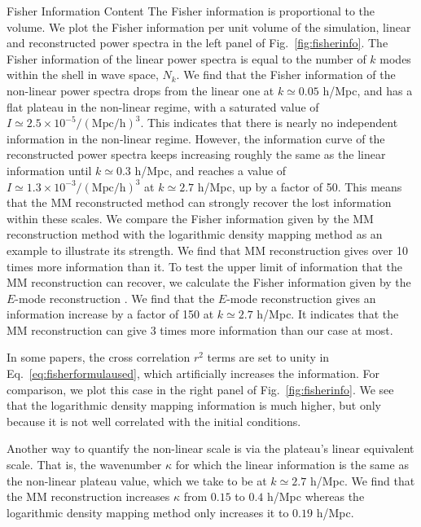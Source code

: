 \begin{section}{Fisher Information Content}
  The Fisher information is proportional to the volume. 
  We plot the Fisher information per unit volume of the
  simulation, linear and reconstructed power spectra in the left panel of 
  Fig.~\ref{fig:fisherinfo}. The Fisher information of the linear 
  power spectra is equal to the number of $k$ modes within the shell in 
  wave space, $N_k$. We find that the Fisher information of the
  non-linear power spectra drops from the linear one at
  $k \simeq 0.05$ h/Mpc, and has a flat plateau in the non-linear
  regime, with a saturated value of
  $I \simeq 2.5 \times 10^{-5}/\mathrm{(Mpc/h)}^3$.  This indicates
  that there is nearly no independent information in the non-linear
  regime.  However, the information curve of the reconstructed power
  spectra keeps increasing roughly the same as the linear information
  until $k\simeq 0.3$ h/Mpc, and reaches a value of 
  $I \simeq 1.3 \times 10^{-3}/\mathrm{(Mpc/h)}^3$ at $k \simeq 2.7$ h/Mpc, up by a
  factor of 50.  
  This means that the MM reconstructed method can
  strongly recover the lost information within these scales.  
  We compare the Fisher information given by the MM reconstruction method
  with the logarithmic density mapping method \cite{bib:Mark2009} as
  an example to illustrate its strength. We find that MM
  reconstruction gives over 10 times more information than it.  
  To test the upper limit of information that the MM reconstruction can recover, 
  we calculate the Fisher information given by the $E$-mode reconstruction \cite{bib:Yu2016}. 
  We find that the $E$-mode reconstruction gives an information increase by a factor of 150 at 
  $k \simeq 2.7$ h/Mpc. It indicates that the MM reconstruction can give 3 times more 
  information than our case at most. 

  In some papers, the cross correlation $r^2$ terms are set
  to unity in Eq.~\ref{eq:fisherformulaused}, which artificially
  increases the information.  For comparison, we plot this case in the right panel of 
  Fig.~\ref{fig:fisherinfo}.  We see that the logarithmic density
  mapping information is much higher, but only because it is not well
  correlated with the initial conditions.

  Another way to quantify the non-linear scale is via the plateau's linear equivalent scale.  
  That is, the wavenumber $\kappa$ for which the linear information is the same as the non-linear 
  plateau value, which we take to be at $k \simeq 2.7$ h/Mpc.  We find that the MM reconstruction 
  increases $\kappa$ from $0.15$ to $0.4$ h/Mpc whereas the logarithmic density 
  mapping method only increases it to $0.19$ h/Mpc.


\end{section}
